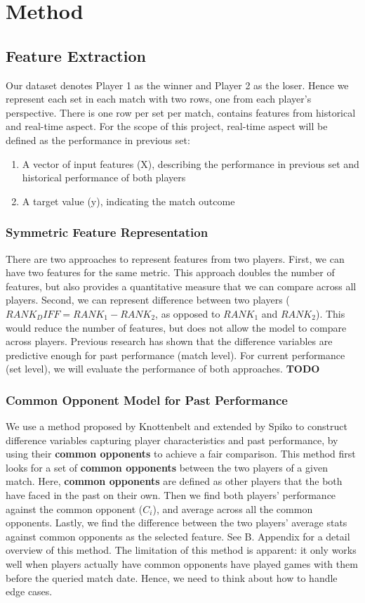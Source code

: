 \documentclass[paper=a4, fontsize=11pt]{scrartcl} %
\numberwithin{equation}{section} %
\numberwithin{figure}{section} %
\numberwithin{table}{section} %
\begin{document}
\section{Method}
\subsection{Feature Extraction}
\label{sec:label}
Our dataset denotes Player 1 as the winner and Player 2 as the loser.  Hence we represent each set in each match with two rows, one from each player's perspective.  There is one row per set per match, contains features from historical and real-time aspect.  For the scope of this project, real-time aspect will be defined as the performance in previous set:
\begin{enumerate}
\item A vector of input features (X), describing the performance in previous set and historical performance of both players
\item A target value (y), indicating the match outcome
\end{enumerate}
\subsubsection{Symmetric Feature Representation}
There are two approaches to represent features from two players.  First, we can have two features for the same metric.  This approach doubles the number of features, but also provides a quantitative measure that we can compare across all players.  Second, we can represent difference between two players ($RANK_DIFF = RANK_1 - RANK_2$, as opposed to $RANK_1$ and $RANK_2$).  This would reduce the number of features, but does not allow the model to compare across players.  Previous research has shown that the difference variables are predictive enough \cite{tennis1} \cite{omalley} for past performance (match level).  For current performance (set level), we will evaluate the performance of both approaches.  
\textbf{TODO}
\subsubsection{Common Opponent Model for Past Performance}
We use a method proposed by Knottenbelt \cite{KNOTTENBELT20123820} and extended by Spiko \cite{tennis1} to construct difference variables capturing player characteristics and past performance, by using their \textbf{common opponents} to achieve a fair comparison. 
This method first looks for a set of \textbf{common opponents} between the two players of a given match. Here, \textbf{common opponents} are defined as other players that the both have faced in the past on their own. Then we find both players' performance against the common opponent ($C_i$), and average across all the common opponents. Lastly, we find the difference between the two players' average stats against common opponents as the selected feature.  See B. Appendix for a detail overview of this method.
The limitation of this method is apparent: it only works well when players actually have common opponents have played games with them before the queried match date. Hence, we need to think about how to handle edge cases.
\end{document}
